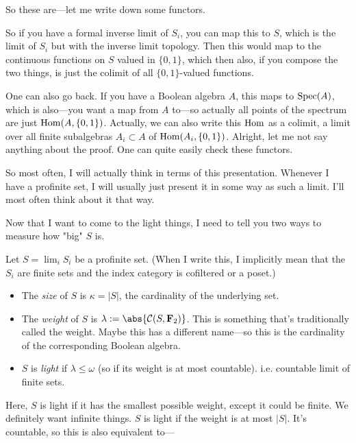So these are---let me write down some functors.


So if you have a formal inverse limit of $S_i$, you can map this to $S$, which is the limit of $S_i$ but with the inverse limit topology. 
Then this would map to the continuous functions on $S$ valued in $\{0,1\}$, which then also, if you compose the two things, is just the colimit of all $\{0,1\}$-valued functions.

One can also go back. If you have a Boolean algebra $A$, this maps to $\operatorname{Spec}(A)$, which is also---you want a map from $A$ to---so actually all points of the spectrum are just $\operatorname{Hom}(A, \{0,1\})$. Actually, we can also write this $\operatorname{Hom}$ as a colimit, a limit over all finite subalgebras $A_i \subset A$ of $\operatorname{Hom}(A_i, \{0,1\})$. Alright, let me not say anything about the proof. One can quite easily check these functors.

So most often, I will actually think in terms of this presentation. Whenever I have a profinite set, I will usually just present it in some way as such a limit. I'll most often think about it that way.

Now that I want to come to the light things, I need to tell you two ways to measure how "big" $S$ is. 

\begin{definition}
Let $S = \lim_{i} S_i$ be a profinite set. (When I write this, I implicitly mean that the $S_i$ are finite sets and the index category is cofiltered or a poset.)

\begin{itemize}
\item The \emph{size} of $S$ is $\kappa = |S|$, the cardinality of the underlying set. 
\item The \emph{weight} of $S$ is  $\lambda := \abs{\Cont(S, \F_2)}$. This is something that's traditionally called the weight. Maybe this has a different name---so this is the cardinality of the corresponding Boolean algebra.
\item $S$ is \emph{light} if $\lambda \leq \omega$ (so if its weight is at most countable). i.e. countable limit of finite sets.
\end{itemize}

Here, $S$ is light if it has the smallest possible weight, except it could be finite. We definitely want infinite things. $S$ is light if the weight is at most $|S|$. It's countable, so this is also equivalent to--- 

\end{definition}

